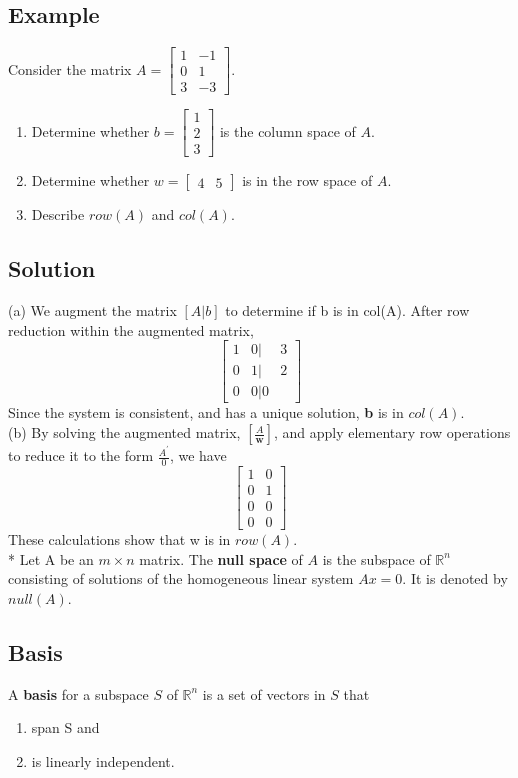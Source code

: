 \subsection*{Example}
Consider the matrix $A = \begin{bmatrix}
    1&-1\\0&1\\3&-3
\end{bmatrix}$. \\\begin{enumerate}[a]
    \item Determine whether $b = \begin{bmatrix}
        1\\2\\3
    \end{bmatrix}$ is the column space of $A$.
    \item Determine whether $w = \begin{bmatrix}
        4&5
    \end{bmatrix}$ is in the row space of $A$.
    \item Describe $row(A)$ and $col(A)$.
\end{enumerate}
\subsection*{Solution}
(a) We augment the matrix $[A|b]$ to determine if b is in col(A). After row reduction within the augmented matrix, 
$$\begin{bmatrix}
    1&0|&3\\0&1|&2\\0&0|0
\end{bmatrix}$$
Since the system is consistent, and has a unique solution, \textbf{b} is in $col(A)$.\\
(b) By solving the augmented matrix, $[\frac{A}{\textbf{w}}]$, and apply elementary row operations to reduce it to the form $\frac{A^\prime}{0}$, we have
$$\begin{bmatrix}
    1&0\\0&1\\0&0\\0&0
\end{bmatrix}$$ These calculations show that w is in $row(A)$.\\*
Let A be an $m\times n$ matrix. The \textbf{null space} of $A$ is the subspace of $\mathbb{R}^n$ consisting of solutions of the homogeneous linear system $Ax = 0$. It is denoted by $null(A)$.\\
\subsection*{Basis}
A \textbf{basis} for a subspace $S$ of $\mathbb{R}^n$ is a set of vectors in $S$ that \begin{enumerate}
    \item span S and 
    \item is linearly independent.
\end{enumerate}

